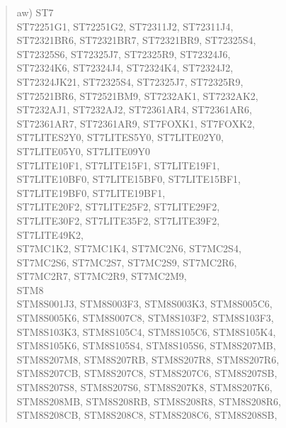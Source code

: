\documentclass[12pt,a4paper,twoside]{report}
\begin{document}
\begin{quote}
aw) ST7 \\
    ST72251G1, ST72251G2, ST72311J2, ST72311J4, \\
    ST72321BR6, ST72321BR7, ST72321BR9, ST72325S4, \\
    ST72325S6, ST72325J7, ST72325R9, ST72324J6, \\
    ST72324K6, ST72324J4, ST72324K4, ST72324J2, \\
    ST72324JK21, ST72325S4, ST72325J7, ST72325R9, \\
    ST72521BR6, ST72521BM9, ST7232AK1, ST7232AK2, \\
    ST7232AJ1, ST7232AJ2, ST72361AR4, ST72361AR6, \\
    ST72361AR7, ST72361AR9, ST7FOXK1, ST7FOXK2, \\
    ST7LITES2Y0, ST7LITES5Y0, ST7LITE02Y0, \\
    ST7LITE05Y0, ST7LITE09Y0 \\
    ST7LITE10F1, ST7LITE15F1, ST7LITE19F1, \\
    ST7LITE10BF0, ST7LITE15BF0, ST7LITE15BF1, \\
    ST7LITE19BF0, ST7LITE19BF1, \\
    ST7LITE20F2, ST7LITE25F2, ST7LITE29F2, \\
    ST7LITE30F2, ST7LITE35F2, ST7LITE39F2, \\
    ST7LITE49K2, \\
    ST7MC1K2, ST7MC1K4, ST7MC2N6, ST7MC2S4, \\
    ST7MC2S6, ST7MC2S7, ST7MC2S9, ST7MC2R6, \\
    ST7MC2R7, ST7MC2R9, ST7MC2M9, \\
    STM8 \\
    STM8S001J3, STM8S003F3, STM8S003K3, STM8S005C6,\\
    STM8S005K6, STM8S007C8, STM8S103F2, STM8S103F3,\\
    STM8S103K3, STM8S105C4, STM8S105C6, STM8S105K4,\\
    STM8S105K6, STM8S105S4, STM8S105S6, STM8S207MB,\\
    STM8S207M8, STM8S207RB, STM8S207R8, STM8S207R6,\\
    STM8S207CB, STM8S207C8, STM8S207C6, STM8S207SB,\\
    STM8S207S8, STM8S207S6, STM8S207K8, STM8S207K6,\\
    STM8S208MB, STM8S208RB, STM8S208R8, STM8S208R6,\\
    STM8S208CB, STM8S208C8, STM8S208C6, STM8S208SB,\\

\end{quote}
\end{document}
